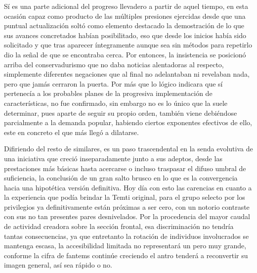 \documentclass[
]{book}
\begin{document}
Sí es una parte adicional del progreso llevadero a partir de aquel tiempo, en esta ocasión capaz como producto de las múltiples presiones ejercidas desde que una puntual actualización soltó como elemento destacado la demostración de lo que sus avances concretados habían posibilitado, eso que desde los inicios había sido solicitado y que tras aparecer íntegramente aunque sea sin métodos para repetirlo dio la señal de que se encontraba cerca. Por entonces, la insistencia se posicionó arriba del conservadurismo que no daba noticias alentadoras al respecto, simplemente diferentes negaciones que al final no adelantaban ni revelaban nada, pero que jamás cerraron la puerta. Por más que lo lógico indicara que sí pertenecía a los probables planes de la progresiva implementación de características, no fue confirmado, sin embargo no es lo único que la suele determinar, pues aparte de seguir su propio orden, también viene debiéndose parcialmente a la demanda popular, habiendo ciertos exponentes efectivos de ello, este en concreto el que más llegó a dilatarse.

Difiriendo del resto de similares, es un paso trascendental en la senda evolutiva de una iniciativa que creció inseparadamente junto a sus adeptos, desde las prestaciones más básicas hasta acercarse o incluso traspasar el difuso umbral de suficiencia, la conclusión de un gran salto brusco en lo que es la convergencia hacia una hipotética versión definitiva. Hoy día con esto las carencias en cuanto a la experiencia que podía brindar la Temti original, para el grupo selecto por los privilegios ya definitivamente están próximas a ser cero, con un notorio contraste con sus no tan presentes pares desnivelados. Por la procedencia del mayor caudal de actividad creadora sobre la sección frontal, esa discriminación no tendría tantas consecuencias, ya que entretanto la rotación de individuos involucrados se mantenga escasa, la accesibilidad limitada no representará un pero muy grande, conforme la cifra de fantems continúe creciendo el antro tenderá a reconvertir su imagen general, así sea rápido o no.
\end{document}
